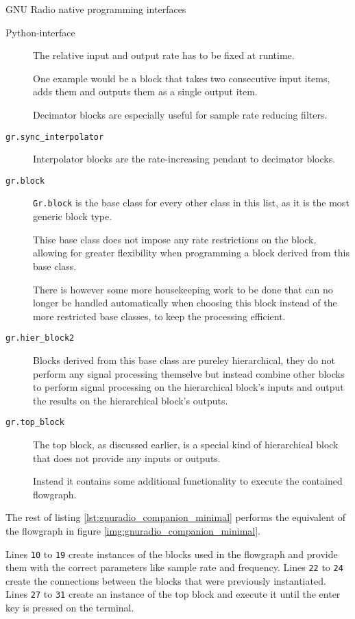 \begin{subchapter}{GNU Radio native programming interfaces}
\begin{subsubchapter}{Python-interface}
\begin{description}
        The relative input and output rate has to be fixed at runtime.

        One example would be a block that takes two consecutive input
        items, adds them and outputs them as a single output item.

        Decimator blocks are especially useful for
        sample rate reducing filters.

      \item[\texttt{gr.sync\_interpolator}]
        Interpolator blocks are the rate-increasing pendant
        to decimator blocks.

      \item[\texttt{gr.block}]
        \texttt{Gr.block} is the base class for every other class
        in this list, as it is the most generic block type.

        Thise base class does not impose any rate restrictions
        on the block, allowing for greater flexibility when
        programming a block derived from this base class.

        There is however some more housekeeping work to be
        done that can no longer be handled automatically when
        choosing this block instead of the more restricted base classes,
        to keep the processing efficient.

      \item[\texttt{gr.hier\_block2}]
        Blocks derived from this base class are pureley
        hierarchical, they do not perform any signal processing
        themselve but instead combine other blocks to perform
        signal processing on the hierarchical block's inputs and
        output the results on the hierarchical block's outputs.

      \item[\texttt{gr.top\_block}]
        The top block, as discussed earlier, is a special kind of
        hierarchical block that does not provide any inputs or outputs.

        Instead it contains some additional functionality to execute
        the contained flowgraph.
    \end{description}

    The rest of listing \ref{lst:gnuradio_companion_minimal}
    performs the equivalent of the flowgraph in figure
    \ref{img:gnuradio_companion_minimal}.

    Lines \texttt{10} to \texttt{19} create instances of the
    blocks used in the flowgraph and provide them with the
    correct parameters like sample rate and frequency.
    Lines \texttt{22} to \texttt{24} create the connections
    between the blocks that were previously instantiated.
    Lines \texttt{27} to \texttt{31} create an instance of the
    top block and execute it until the enter key is pressed
    on the terminal.


\end{subsubchapter}
\end{subchapter}
